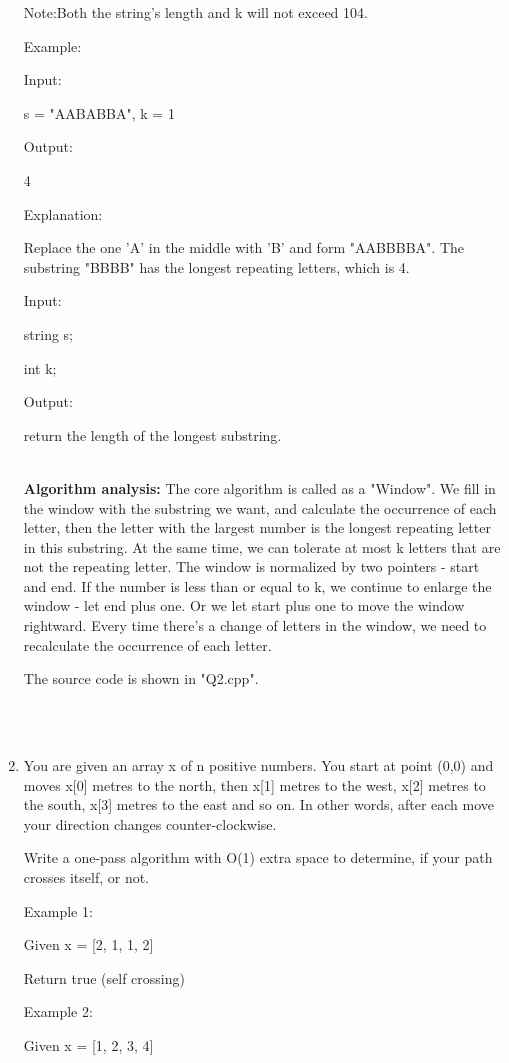 \documentclass[12pt,a4paper]{article}
\begin{document}
\begin{enumerate}
Note:Both the string's length and k will not exceed 104.

Example:

Input:

s = "AABABBA", k = 1

Output:

4

Explanation:

Replace the one 'A' in the middle with 'B' and form "AABBBBA".
The substring "BBBB" has the longest repeating letters, which is 4.

Input:

string s;

int k;

Output:

return the length of the longest substring.

~\\

\textbf{Algorithm analysis:}
The core algorithm is called as a "Window". We fill in the window with the substring we want, and calculate the occurrence of each letter, then the letter with the largest number is the longest repeating letter in this substring. At the same time, we can tolerate at most k letters that are not the repeating letter. The window is normalized by two pointers - start and end. If the number is less than or equal to k, we continue to enlarge the window - let end plus one. Or we let start plus one to move the window rightward. Every time there's a change of letters in the window, we need to recalculate the occurrence of each letter.

The source code is shown in "Q2.cpp".

~\\
~\\


\item You are given an array x of n positive numbers. You start at point (0,0) and moves x[0] metres to the north, then x[1] metres to the west, x[2] metres to the south, x[3] metres to the east and so on. In other words, after each move your direction changes counter-clockwise.

Write a one-pass algorithm with O(1) extra space to determine, if your path crosses itself, or not.

Example 1:

Given x = [2, 1, 1, 2]

Return true (self crossing)

Example 2:

Given x = [1, 2, 3, 4]


\end{enumerate}
\end{document}
